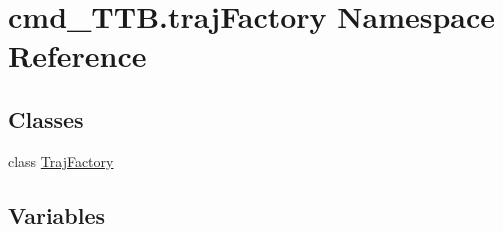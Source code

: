 \hypertarget{namespacecmd__TTB_1_1trajFactory}{}\section{cmd\+\_\+\+T\+T\+B.\+traj\+Factory Namespace Reference}
\label{namespacecmd__TTB_1_1trajFactory}
\subsection*{Classes}
\begin{DoxyCompactItemize}
\item 
class \hyperlink{classcmd__TTB_1_1trajFactory_1_1TrajFactory}{Traj\+Factory}
\end{DoxyCompactItemize}
\subsection*{Variables}
